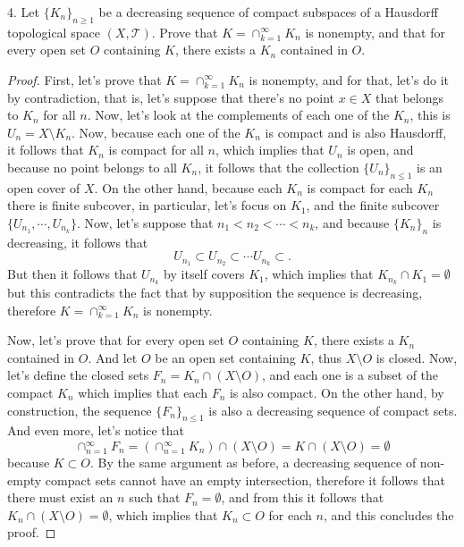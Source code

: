 \documentclass[11pt]{amsart}
\begin{document}
\newpage
\begin{tcolorbox}
4. Let $\{K_{n}\}_{n\geq 1}$ be a decreasing sequence of compact subspaces of a Hausdorff topological space $(X,\mathcal{T})$.
Prove that $K = \cap_{k=1}^{\infty}K_{n}$  is nonempty, and that for every open set $O$ containing $K$, there exists a $K_{n}$
contained in $O$.
\end{tcolorbox}

\begin{proof}
First, let's prove that $K = \cap_{k=1}^{\infty}K_{n}$  is nonempty, and for that, let's do it by contradiction, that is, let's suppose that there's no point $x\in X$ that belongs to $K_{n}$ for all $n$. Now, let's look at the complements of each one of the $K_{n}$, this is $U_{n} = X\setminus K_{n}$. Now, because each one of the $K_{n}$ is compact and is also Hausdorff, it follows that $K_{n}$ is compact for all $n$, which implies that $U_{n}$ is open, and because no point belongs to all $K_{n}$, it follows that the collection $\{U_{n}\}_{n\leq 1}$ is an open cover of $X$. On the other hand, because each $K_{n}$ is compact for each $K_{n}$ there is finite subcover, in particular, let's focus on $K_{1}$, and the finite subcover $\{ U_{n_{1}},\cdots, U_{n_{k}}\}$. Now, let's suppose that $n_{1}<n_{2}<\cdots<n_{k}$, and because $\{K_{n}\}_{n}$ is decreasing, it follows that
$$
U_{n_{1}}\subset U_{n_{2}}\subset\cdots U_{n_{k}}\subset.
$$
But then it follows that $U_{n_{k}}$ by itself covers $K_{1}$, which implies that $K_{n_{k}}\cap K_{1}=\emptyset$ but this contradicts the fact that by supposition the sequence is decreasing, therefore $K = \cap_{k=1}^{\infty}K_{n}$  is nonempty.

Now, let's prove that for every open set $O$ containing $K$, there exists a $K_{n}$ contained in $O$. And let $O$ be an open set containing $K$, thus $X\setminus O$ is closed. Now, let's define the closed sets $F_{n} = K_{n}\cap(X\setminus O)$, and each one is a subset of the compact $K_{n}$ which implies that each $F_{n}$ is also compact. On the other hand, by construction, the sequence $\{F_{n}\}_{n\leq 1}$ is also a decreasing sequence of compact sets. And even more, let's notice that 
$$
\cap_{n=1}^{\infty}F_{n} = (\cap_{n=1}^{\infty}K_{n})\cap(X\setminus O) = K\cap (X\setminus O)=\emptyset
$$
because $K\subset O$. By the same argument as before, a decreasing sequence of non-empty compact sets cannot have an empty intersection, therefore it follows that there must exist an $n$ such that $F_{n}=\emptyset$, and from this it follows that $K_{n}\cap(X\setminus O)=\emptyset$, which implies that $K_{n}\subset O$ for each $n$, and this concludes the proof.
\end{proof}
\end{document}
